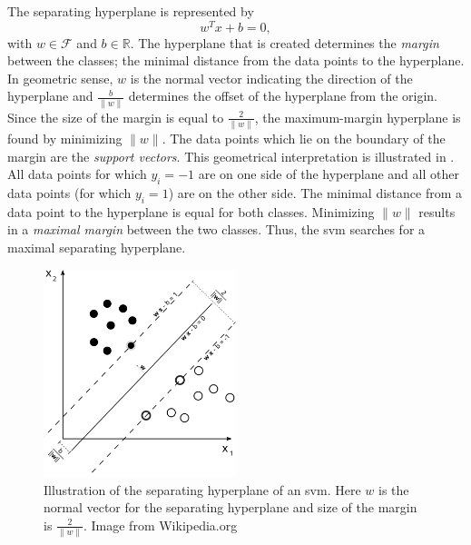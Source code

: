 The separating hyperplane is represented by
\begin{equation}
w^T x + b = 0,
\end{equation}
with $w \in \mathcal{F}$ and $b \in \mathbb{R}$.
The hyperplane that is created determines the \emph{margin} between the classes; the minimal distance from the data points to the hyperplane.
In geometric sense, $w$ is the normal vector indicating the direction of the hyperplane and $\frac{b}{\lVert{w}\rVert}$ determines the offset of the hyperplane from the origin.
Since the size of the margin is equal to $\frac{2}{\lVert{w}\rVert}$, the maximum-margin hyperplane is found by minimizing $\lVert{w}\rVert$.
The data points which lie on the boundary of the margin are the \emph{support vectors}.
This geometrical interpretation is illustrated in .
All data points for which $y_i = -1$ are on one side of the hyperplane and all other data points (for which $y_i = 1$) are on the other side.
The minimal distance from a data point to the hyperplane is equal for both classes.
Minimizing $\lVert{w}\rVert$ results in a \emph{maximal margin} between the two classes.
Thus, the \gls{svm} searches for a maximal separating hyperplane.

\begin{figure}
\centering
  \includegraphics[width=0.5\textwidth]{./Figures/chapter3/svm_separating_plane_with_margin.png}
  \caption[\gls{svm} and the separating hyperplane]{Illustration of the separating hyperplane of an \gls{svm}.
  Here $w$ is the normal vector for the separating hyperplane and size of the margin is $\frac{2}{\lVert{w}\rVert}$.
  Image from Wikipedia.org}
  \label{fig:svm_hyperplane}
\end{figure}

